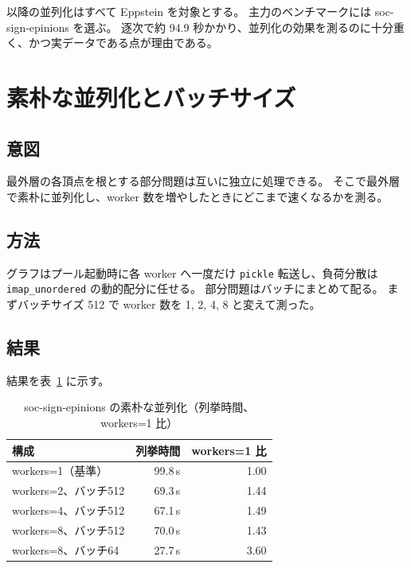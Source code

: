 以降の並列化はすべて Eppstein を対象とする。
主力のベンチマークには soc-sign-epinions を選ぶ。
逐次で約 94.9 秒かかり、並列化の効果を測るのに十分重く、かつ実データである点が理由である。

\section{素朴な並列化とバッチサイズ}
\label{sec:naive}

\subsection{意図}

最外層の各頂点を根とする部分問題は互いに独立に処理できる。
そこで最外層で素朴に並列化し、worker 数を増やしたときにどこまで速くなるかを測る。

\subsection{方法}

グラフはプール起動時に各 worker へ一度だけ \texttt{pickle} 転送し、負荷分散は \texttt{imap\_unordered} の動的配分に任せる。
部分問題はバッチにまとめて配る。
まずバッチサイズ 512 で worker 数を 1, 2, 4, 8 と変えて測った。

\subsection{結果}

結果を表~\ref{tab:naive-batch} に示す。

\begin{table}[htbp]
  \centering
  \caption{soc-sign-epinions の素朴な並列化（列挙時間、workers=1 比）}
  \label{tab:naive-batch}
  \begin{tabular}{lrr}
    \toprule
    構成 & 列挙時間 & workers=1 比 \\
    \midrule
    workers=1（基準）        & 99.8\,s & 1.00 \\
    workers=2、バッチ512     & 69.3\,s & 1.44 \\
    workers=4、バッチ512     & 67.1\,s & 1.49 \\
    workers=8、バッチ512     & 70.0\,s & 1.43 \\
    workers=8、バッチ64      & 27.7\,s & 3.60 \\
    \bottomrule
  \end{tabular}
\end{table}

